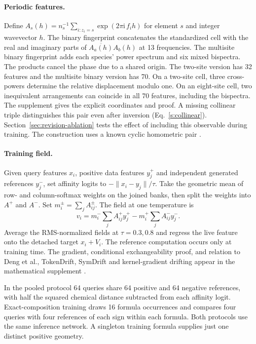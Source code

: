 \documentclass[10pt]{article}
\begin{document}
\paragraph{Periodic features.} Define $A_s(h)=n_s^{-1}\sum_{i:z_i=s}\exp(2\pi\mathrm{i}\,f_i h)$ for element $s$ and integer wavevector $h$. The binary fingerprint concatenates the standardized cell with the real and imaginary parts of $\overline{A_a(h)}A_b(h)$ at 13 frequencies. The multisite binary fingerprint adds each species' power spectrum and six mixed bispectra. The products cancel the phase due to a shared origin. The two-site version has 32 features and the multisite binary version has 70. On a two-site cell, three cross-powers determine the relative displacement modulo one. On an eight-site cell, two inequivalent arrangements can coincide in all 70 features, including the bispectra. The supplement gives the explicit coordinates and proof. A missing collinear triple distinguishes this pair even after inversion (Eq.~\eqref{s:collinear}). Section~\ref{sec:revision-ablation} tests the effect of including this observable during training. The construction uses a known cyclic homometric pair \cite{zrelation}.

\paragraph{Training field.} Given query features $x_i$, positive data features $y_j^+$ and independent generated references $y_j^-$, set affinity logits to $-\|x_i-y_j\|/\tau$. Take the geometric mean of row- and column-softmax weights on the joined banks, then split the weights into $A^+$ and $A^-$. Set $m_i^\pm=\sum_jA^\pm_{ij}$. The field at one temperature is
\[
 v_i=m_i^-\sum_j A^+_{ij}y_j^+-m_i^+\sum_j A^-_{ij}y_j^- .
\]
Average the RMS-normalized fields at $\tau=0.3,0.8$ and regress the live feature onto the detached target $x_i+V_i$. The reference computation occurs only at training time. The gradient, conditional exchangeability proof, and relation to Deng et al., TokenDrift, SymDrift and kernel-gradient drifting appear in the mathematical supplement \cite{deng,tokendrift,symdrift,kgdrift}.

In the pooled protocol 64 queries share 64 positive and 64 negative references, with half the squared chemical distance subtracted from each affinity logit. Exact-composition training draws 16 formula occurrences and compares four queries with four references of each sign within each formula. Both protocols use the same inference network. A singleton training formula supplies just one distinct positive geometry.
\end{document}
